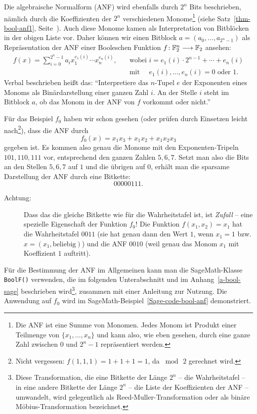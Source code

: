 \begin{refsegment}
Die algebraische Normalform
(ANF) wird ebenfalls durch $2^n$ Bits beschrieben,
nämlich durch die Koeffizienten der $2^n$ verschiedenen Monome\footnote{%
  Die ANF ist eine Summe von Monomen. Jedes Monom ist Produkt einer Teilmenge
  von $\{x_1, \ldots, x_n \}$ und kann also, wie eben gesehen, durch eine
  ganze Zahl zwischen $0$ und $2^n-1$ repräsentiert werden.
}
(siehe Satz~\ref{thm-bool-anf1}, Seite~\pageref{thm-bool-anf1}). Auch diese
Monome kamen als Interpretation von Bitblöcken in der obigen Liste vor.
Daher können wir einen Bitblock $a = (a_0, \ldots, a_{2^n-1})$ als Repräsentation
der ANF einer Booleschen Funktion
$f\!: \mathbb{F}_2^n \longrightarrow \mathbb{F}_2$ ansehen:
\begin{align*}
     f(x) = \sum_{i=0}^{2^n-1} a_i x_1^{e_1(i)} \cdots x_n^{e_n(i)}, \quad & \text{wobei }
     i = e_1(i) \cdot 2^{n-1} + \cdots + e_n(i) \\
     & \text{mit }\quad e_1(i), \ldots, e_n(i) = 0 \text{ oder } 1.
\end{align*}
Verbal beschrieben heißt das: "`Interpretiere das $n$-Tupel $e$ der Exponenten
eines Monoms als Binärdarstellung einer ganzen Zahl $i$. An der Stelle $i$ steht im
Bitblock $a$, ob das Monom in der ANF von $f$ vorkommt oder nicht."'

Für das Beispiel $f_0$ haben wir schon gesehen (oder prüfen durch Einsetzen
leicht nach\footnote{%
   Nicht vergessen: $f(1,1,1) = 1 + 1 + 1 = 1$, da $\bmod\,2$ gerechnet wird.
}), dass die ANF durch
\[
     f_0(x) = x_1 x_3 + x_1 x_2 + x_1 x_2 x_3
\]
gegeben ist. Es kommen also genau die Monome mit den Exponenten-Tripeln
$101, 110, 111$ vor, entsprechend den ganzen Zahlen $5, 6, 7$.
Setzt man also die Bits an den Stellen $5, 6, 7$ auf $1$ und die übrigen
auf $0$, erhält man die sparsame Darstellung der ANF durch eine Bitkette:
\[
     00000111.
\]

\begin{description}
   \item[Achtung:] Dass das die gleiche Bitkette wie für die Wahrheitstafel
      ist, ist {\em Zufall} -- eine spezielle Eigenschaft der Funktion $f_0$!
      Die Funktion $f(x_1,x_2) = x_1$ hat die Wahrheitstafel $0011$ (sie hat genau
      dann den Wert $1$, wenn $x_1 = 1$ bzw. $x = (x_1,\text{beliebig})$) und
      die ANF $0010$ (weil genau das Monom $x_1$ mit Koeffizient $1$ auftritt).
\end{description}

Für die Bestimmung der ANF im Allgemeinen kann man die SageMath-Klasse
{\tt BoolF()} verwenden, die im folgenden Unterabschnitt und im
Anhang~\ref{a-bool-sage} beschrieben wird\footnote{%
  Diese Transformation, die eine Bitkette der Länge $2^n$ -- die Wahrheitstafel
  -- in eine andere Bitkette der Länge $2^n$ -- die Liste der Koeffizienten
  der ANF -- umwandelt, wird gelegentlich als
  Reed-Muller-Transformation
  oder als binäre Möbius-Transformation bezeichnet.
}, zusammen mit einer Anleitung zur Nutzung. Die Anwendung auf $f_0$
wird im SageMath-Beispiel~\ref{Sage-code-bool-anf} demonstriert.


\end{refsegment}
